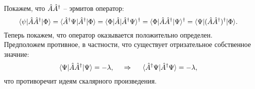 Покажем, что $\hat{A} \hat{A}^{\dag}$ -- эрмитов оператор:
\begin{equation*}
    \bk{\psi}[\hat{A} \hat{A}\con]{\Phi} = \bk{\hat{A}\con \Psi}[\hat{A}\con]{\Phi} = \bk{\Phi}[\hat{A}]{\hat{A}\con \Psi}\con  = \bk{\Phi}[\hat{A} \hat{A}\con]{\Psi}\con = \bk{\Psi}[(\hat{A} \hat{A}\con)\con]{\Phi}.
\end{equation*}
Теперь покажем, что оператор оказывается положительно определен. Предположем противное, в частности, что существует отризательное собственное значние:
\begin{equation*}
    \bk{\Psi}[\hat{A} \hat{A}\con]{\Psi} = - \lambda,
    \hspace{0.5cm} \Rightarrow \hspace{0.5cm}
    \bk{\hat{A}\con \Psi}{\hat{A}\con \Psi} = - \lambda,
\end{equation*}
что противоречит идеям скалярного произведения. 